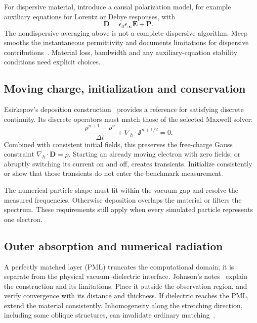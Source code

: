 \documentclass[11pt,a4paper]{article}
\numberwithin{equation}{section}
\begin{document}
For dispersive material, introduce a causal polarization model, for example
auxiliary equations for Lorentz or Debye responses, with
\begin{equation}
 \mathbf D=\epsilon_0\epsilon_\infty\mathbf E+\mathbf P.
\end{equation}
The nondispersive averaging above is not a complete dispersive algorithm.
Meep smooths the instantaneous permittivity and documents limitations
for dispersive contributions~\cite{meepSubpixel}. Material loss, bandwidth
and any auxiliary-equation stability conditions need explicit choices.

\subsection{Moving charge, initialization and conservation}
\label{sec:source-consistency}

Esirkepov's deposition construction~\cite{esirkepov2001charge}
provides a reference for satisfying discrete continuity. Its discrete
operators must match those of the selected Maxwell solver:
\begin{equation}
 \frac{\rho^{n+1}-\rho^n}{\Delta t}
 +\nabla_h\cdot\mathbf J^{n+1/2}=0.
 \label{eq:continuity}
\end{equation}
Combined with consistent initial fields, this preserves the free-charge
Gauss constraint \(\nabla_h\cdot\mathbf D=\rho\).
Starting an already moving electron with zero fields, or abruptly switching
its current on and off, creates transients. Initialize consistently or
show that those transients do not enter the benchmark measurement.

The numerical particle shape must fit within the vacuum gap and resolve
the measured frequencies. Otherwise deposition overlaps the material or
filters the spectrum. These requirements still apply when every simulated
particle represents one electron.

\subsection{Outer absorption and numerical radiation}

A perfectly matched layer (PML) truncates the computational domain;
it is separate from the physical vacuum--dielectric interface.
Johnson's notes~\cite{johnson2021pml} explain the construction and its
limitations. Place it outside the observation region, and verify convergence
with its distance and thickness. If dielectric reaches the PML, extend
the material consistently. Inhomogeneity along the stretching direction,
including some oblique structures, can invalidate ordinary
matching~\cite{meepPML}.
\end{document}
